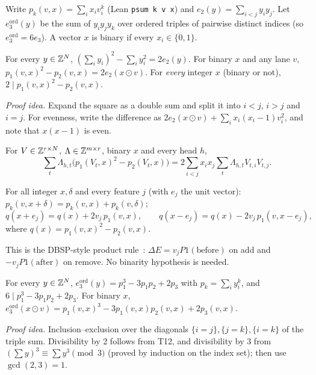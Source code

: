 Write $p_k(v,x)=\sum_ix_iv_i^k$ (Lean \texttt{psum k v x}) and $e_2(y)=\sum_{i<j}y_iy_j$.
Let $e_3^{\mathrm{ord}}(y)$ be the sum of $y_iy_jy_k$ over ordered triples of pairwise distinct indices (so $e_3^{\mathrm{ord}}=6e_3$).
A vector $x$ is binary if every $x_i\in\{0,1\}$.

\begin{theorem}\label{thm:t12}
For every $y\in\mathbb{Z}^N$, $(\sum_iy_i)^2-\sum_iy_i^2=2e_2(y)$.
For binary $x$ and any lane $v$, $p_1(v,x)^2-p_2(v,x)=2e_2(x\odot v)$.
For \emph{every} integer $x$ (binary or not), $2\mid p_1(v,x)^2-p_2(v,x)$.
\end{theorem}
\noindent\emph{Proof idea.} Expand the square as a double sum and split it into $i<j$, $i>j$ and $i=j$. For evenness, write the difference as $2e_2(x\odot v)+\sum_ix_i(x_i-1)v_i^2$, and note that $x(x-1)$ is even.

\begin{theorem}\label{thm:t13}
For $V\in\mathbb{Z}^{r\times N}$, $\Lambda\in\mathbb{Z}^{m\times r}$, binary $x$ and every head $h$,
\[
\sum_t\Lambda_{h,t}\big(p_1(V_t,x)^2-p_2(V_t,x)\big)=2\sum_{i<j}x_ix_j\sum_t\Lambda_{h,t}V_{t,i}V_{t,j}.
\]
\end{theorem}

\begin{theorem}\label{thm:t14}
For all integer $x,\delta$ and every feature $j$ (with $e_j$ the unit vector):
$p_k(v,x+\delta)=p_k(v,x)+p_k(v,\delta)$;
\[
q(x+e_j)=q(x)+2v_j\,p_1(v,x),\qquad q(x-e_j)=q(x)-2v_j\,p_1(v,x-e_j),
\]
where $q(x)=p_1(v,x)^2-p_2(v,x)$.
\end{theorem}
\noindent This is the DBSP-style product rule~\cite{budiu2023}: $\Delta E=v_jP1(\text{before})$ on add and $-v_jP1(\text{after})$ on remove. No binarity hypothesis is needed.

\begin{theorem}\label{thm:t15}
For every $y\in\mathbb{Z}^N$, $e_3^{\mathrm{ord}}(y)=p_1^3-3p_1p_2+2p_3$ with $p_k=\sum_iy_i^k$, and $6\mid p_1^3-3p_1p_2+2p_3$.
For binary $x$, $e_3^{\mathrm{ord}}(x\odot v)=p_1(v,x)^3-3p_1(v,x)p_2(v,x)+2p_3(v,x)$.
\end{theorem}
\noindent\emph{Proof idea.} Inclusion--exclusion over the diagonals $\{i=j\},\{j=k\},\{i=k\}$ of the triple sum. Divisibility by 2 follows from T12, and divisibility by 3 from $(\sum y)^3\equiv\sum y^3\pmod 3$ (proved by induction on the index set); then use $\gcd(2,3)=1$.

